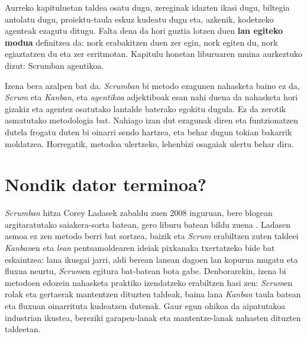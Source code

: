 
Aurreko kapituluetan taldea osatu dugu, zereginak idazten ikasi dugu, biltegia antolatu dugu, proiektu-taula eskuz kudeatu dugu eta, azkenik, kodetzeko agenteak ezagutu ditugu.
Falta dena da hori guztia lotzen duen \textbf{lan egiteko modua} definitzea da: nork erabakitzen duen zer egin, nork egiten du, nork egiaztatzen du eta zer erritmotan.
Kapitulu honetan liburuaren muina aurkeztuko dizut: Scrumban agentikoa.

Izena bera azalpen bat da.
\textit{Scrumban} bi metodo ezagunen nahasketa baino ez da, \textit{Scrum} eta \textit{Kanban}, eta \textit{agentikoa} adjektiboak esan nahi duena da nahasketa hori gizakiz eta agentez osatutako lantalde baterako egokitu dugula.
Ez da zerotik asmatutako metodologia bat.
Nahiago izan dut ezagunak diren eta funtzionatzen dutela frogatu duten bi oinarri sendo hartzea, eta behar dugun tokian bakarrik moldatzea.
Horregatik, metodoa ulertzeko, lehenbizi osagaiak ulertu behar dira.

\section{Nondik dator terminoa?}

\textit{Scrumban} hitza Corey Ladasek zabaldu zuen 2008 inguruan, bere blogean argitaratutako saiakera-sorta batean, gero liburu batean bildu zuena \parencite{ladas2009scrumban}.
Ladasen asmoa ez zen metodo berri bat sortzea, baizik eta \textit{Scrum} erabiltzen zuten taldeei \textit{Kanban}en eta \textit{lean} pentsamoldearen ideiak pixkanaka txertatzeko bide bat eskaintzea:
lana ikusgai jarri, aldi berean lanean dagoen lan kopurua mugatu eta fluxua neurtu, \textit{Scrum}en egitura bat-batean bota gabe.
Denborarekin, izena bi metodoen edozein nahasketa praktiko izendatzeko erabiltzen hasi zen: \textit{Scrum}en rolak eta gertaerak mantentzen dituzten taldeak,
baina lana \textit{Kanban} taula batean eta fluxuan oinarrituta kudeatzen dutenak.
Gaur egun ohikoa da aipatutakoa industrian ikustea, bereziki garapen-lanak eta mantentze-lanak nahasten dituzten taldeetan.

